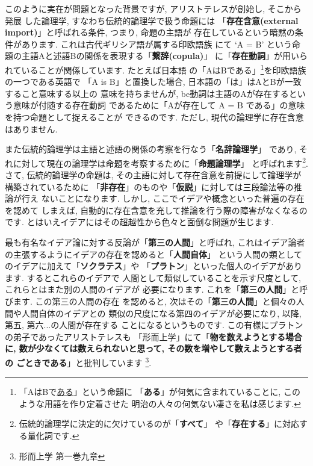 このように実在が問題となった背景ですが, アリストテレスが創始し, そこから発展
した論理学, すなわち伝統的論理学で扱う命題には
「\textbf{存在含意(external import)}」と呼ばれる条件, つまり, 命題の主語が
存在しているという暗黙の条件があります. これは古代ギリシア語が属する印欧語族
にて `A = B' という命題の主語Aと述語Bの関係を表現する「\textbf{繋辞(copula)}」
に「\textbf{存在動詞}」が用いられていることが関係しています. たとえば日本語
の「AはBである」\footnote{「AはBで\underline{ある}」という命題に
「\textbf{ある}」が何気に含まれていることに, このような用語を作り定着させた
明治の人々の何気ない凄さを私は感じます.}を印欧語族の一つである英語で
「A is B」と置換した場合, 日本語の「は」はAとBが一致すること意味する以上の
意味を持ちませんが, be動詞は主語のAが存在するという意味が付随する存在動詞
であるために「Aが存在して A = B である」の意味を持つ命題として捉えることが
できるのです. ただし, 現代の論理学に存在含意はありません.
\newline 

また伝統的論理学は主語と述語の関係の考察を行なう「\textbf{名辞論理学}」
であり, それに対して現在の論理学は命題を考察するために「\textbf{命題論理学}」
と呼ばれます\footnote{伝統的論理学に決定的に欠けているのが「\textbf{すべて}」
や「\textbf{存在する}」に対応する量化詞です.}. さて, 伝統的論理学の命題は,
 その主語に対して存在含意を前提にして論理学が構築されているために
「\textbf{非存在}」のものや「\textbf{仮説}」に対しては三段論法等の推論が行え
ないことになります. しかし, ここでイデアや概念といった普遍の存在を認めて
しまえば, 自動的に存在含意を充して推論を行う際の障害がなくなるのです.
とはいえイデアにはその超越性から色々と面倒な問題が生じます.
\newline

最も有名なイデア論に対する反論が「\textbf{第三の人間}」と呼ばれ, 
 これはイデア論者の主張するようにイデアの存在を認めると「\textbf{人間自体}」
という人間の類としてのイデアに加えて「\textbf{ソクラテス}」や
「\textbf{プラトン}」といった個人のイデアがあります. するとこれらのイデアで
人間として類似していることを示す尺度として, これらとはまた別の人間のイデアが
必要になります. これを「\textbf{第三の人間}」と呼びます. この第三の人間の存在
を認めると, 次はその「\textbf{第三の人間}」と個々の人間や人間自体のイデアとの
類似の尺度になる第四のイデアが必要になり, 以降, 第五, 第六...の人間が存在する
ことになるというものです.  この有様にプラトンの弟子であったアリストテレスも
「形而上学」\cite{アリストテレス2}にて「\textbf{物を数えようとする場合に,
 数が少なくては数えられないと思って, その数を増やして数えようとする者の
ごときである}」と批判しています\cite{アリストテレス2}
\footnote{形而上学 第一巻九章}.
\newline


